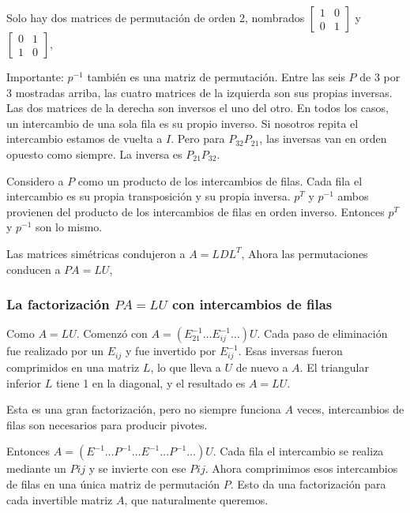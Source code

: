 Solo hay dos matrices de permutación de orden 2, nombrados $\begin{bmatrix}
		1 & 0 \\0&1
	\end{bmatrix}$ y $\begin{bmatrix}
		0 & 1 \\1&0
	\end{bmatrix}$,

Importante: $p^{-1}$ también es una matriz de permutación. Entre las seis $P$ de 3 por 3 mostradas
arriba, las cuatro matrices de la izquierda son sus propias inversas. Las dos matrices de la derecha
son inversos el uno del otro. En todos los casos, un intercambio de una sola fila es su propio inverso. Si nosotros
repita el intercambio estamos de vuelta a $I$. Pero para $P_{32} P_{21}$, las inversas van en orden opuesto
como siempre. La inversa es $P_{21} P_{32}$.

\begin{exercise}[Demostración $p^T=p^{-1}$]
	Considero a $P$ como un producto de los intercambios de filas. Cada fila
	el intercambio es su propia transposición y su propia inversa. $p^T$ y $p^{-1}$ ambos provienen del
	producto de los intercambios de filas en orden inverso. Entonces $p^T$ y $p^{-1}$ son lo mismo.

	Las matrices simétricas condujeron a $A = L D L^T$, Ahora las permutaciones conducen a $P A = L U$,
\end{exercise}

\subsubsection{La factorización $PA = L U$ con intercambios de filas}

Como $A = L U$. Comenzó con $A = (E^{-1}_{21}\dots E^{-1}_{ij} \dots) U$. Cada
paso de eliminación fue realizado por un $E_{ij}$ y fue invertido por $E^{-1}_{ij}$. Esas inversas fueron
comprimidos en una matriz $L$, lo que lleva a $U$ de nuevo a $A$. El triangular inferior $L$ tiene 1 en
la diagonal, y el resultado es $A = L U$.


Esta es una gran factorización, pero no siempre funciona $A$ veces, intercambios de filas
son necesarios para producir pivotes.

Entonces $A = \left(E^{-1}\dots P^{-1}\dots E^{-1}\dots P^{-1}\dots\right)U$. Cada fila
el intercambio se realiza mediante un $Pij$ y se invierte con ese $Pij$. Ahora comprimimos esos intercambios de filas en una única matriz de permutación $P$. Esto da una factorización para cada invertible
matriz $A$, que naturalmente queremos.


